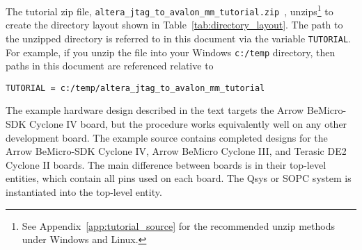 \documentclass[10pt,twoside]{article}
\begin{document}
The tutorial zip file, 
\verb+altera_jtag_to_avalon_mm_tutorial.zip+~\cite{Hawkins_Altera_JTAG_to_Avalon_MM_Tutorial_2012}, 
unzips\footnote{See Appendix~\ref{app:tutorial_source} for
the recommended unzip methods under Windows and Linux.} to create
the directory layout shown in Table~\ref{tab:directory_layout}.
The path to the unzipped directory is referred to in this document
via the variable \verb+TUTORIAL+. For example, if you unzip the 
file into your Windows \verb+c:/temp+ directory, then paths in 
this document are referenced relative to
%
\begin{verbatim}
TUTORIAL = c:/temp/altera_jtag_to_avalon_mm_tutorial
\end{verbatim}
%
The example hardware design described in the text targets the
Arrow BeMicro-SDK Cyclone IV board, but the procedure works
equivalently well on any other development board. The example source 
contains completed designs for the Arrow BeMicro-SDK Cyclone IV, 
Arrow BeMicro Cyclone III, and Terasic DE2 Cyclone II boards.
The main difference between boards is in their top-level entities,
which contain all pins used on each board.
The Qsys or SOPC system is instantiated into the top-level entity.
\end{document}
